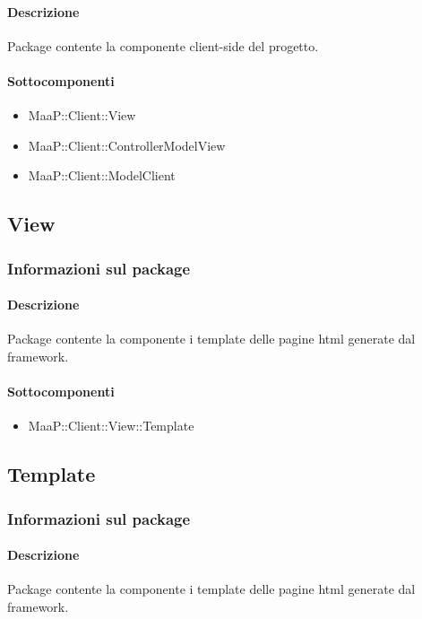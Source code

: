 \paragraph{Descrizione}
Package contente la componente client-side del progetto.

\paragraph{Sottocomponenti}
\begin{itemize}
\item MaaP::Client::View
\item MaaP::Client::ControllerModelView
\item MaaP::Client::ModelClient
\end{itemize}


\subsection{View}
\subsubsection{Informazioni sul package}
\paragraph{Descrizione}
Package contente la componente i template delle pagine html generate dal framework.

\paragraph{Sottocomponenti}
\begin{itemize}
\item MaaP::Client::View::Template
\end{itemize}


\subsection{Template}
\subsubsection{Informazioni sul package}
\paragraph{Descrizione}
Package contente la componente i template delle pagine html generate dal framework.


